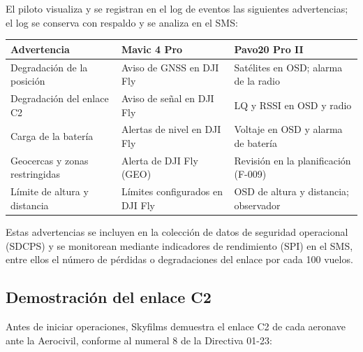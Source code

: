El piloto visualiza y se registran en el log de eventos las siguientes advertencias; el log se conserva con respaldo y se analiza en el SMS:

\renewcommand{\arraystretch}{1.3}
\begin{longtable}{|p{5cm}|p{4.7cm}|p{4cm}|}
\hline
\rowcolor[gray]{0.9}\textbf{Advertencia} & \textbf{Mavic 4 Pro} & \textbf{Pavo20 Pro II} \\ \hline
Degradación de la posición & Aviso de GNSS en DJI Fly & Satélites en OSD; alarma de la radio \\ \hline
Degradación del enlace C2 & Aviso de señal en DJI Fly & LQ y RSSI en OSD y radio \\ \hline
Carga de la batería & Alertas de nivel en DJI Fly & Voltaje en OSD y alarma de batería \\ \hline
Geocercas y zonas restringidas & Alerta de DJI Fly (GEO) & Revisión en la planificación (F-009) \\ \hline
Límite de altura y distancia & Límites configurados en DJI Fly & OSD de altura y distancia; observador \\ \hline
\end{longtable}

Estas advertencias se incluyen en la colección de datos de seguridad operacional (SDCPS) y se monitorean mediante indicadores de rendimiento (SPI) en el SMS, entre ellos el número de pérdidas o degradaciones del enlace por cada 100 vuelos.

\subsection{Demostración del enlace C2}

Antes de iniciar operaciones, Skyfilms demuestra el enlace C2 de cada aeronave ante la Aerocivil, conforme al numeral 8 de la Directiva 01-23:

